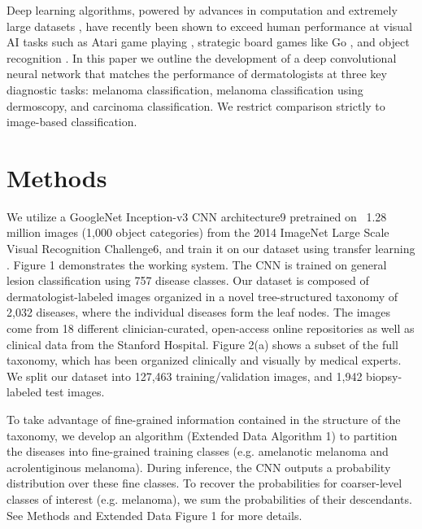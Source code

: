 Deep learning algorithms, powered by advances in computation and extremely large datasets \cite{deng2009imagenet}, have recently been shown to exceed human performance at visual AI tasks such as Atari game playing \cite{mnih2015human}, strategic board games like Go \cite{silver2016mastering}, and object recognition \cite{russakovsky2015imagenet}. In this paper we outline the development of a deep convolutional neural network that matches the performance of dermatologists at three key diagnostic tasks: melanoma classification, melanoma classification using dermoscopy, and carcinoma classification.  We restrict comparison strictly to image-based classification.

\section{Methods}

We utilize a GoogleNet Inception-v3 CNN architecture9 pretrained on ~1.28 million images (1,000 object categories) from the 2014 ImageNet Large Scale Visual Recognition Challenge6, and train it on our dataset using transfer learning \cite{pan2009survey}. Figure 1 demonstrates the working system. The CNN is trained on general lesion classification using 757 disease classes. Our dataset is composed of dermatologist-labeled images organized in a novel tree-structured taxonomy of 2,032 diseases, where the individual diseases form the leaf nodes. The images come from 18 different clinician-curated, open-access online repositories as well as clinical data from the Stanford Hospital. Figure 2(a) shows a subset of the full taxonomy, which has been organized clinically and visually by medical experts. We split our dataset into 127,463 training/validation images,  and 1,942 biopsy-labeled test images.

To take advantage of fine-grained information contained in the structure of the taxonomy, we develop an algorithm (Extended Data Algorithm 1) to partition the diseases into fine-grained training classes (e.g. amelanotic melanoma and acrolentiginous melanoma). During inference, the CNN outputs a probability distribution over these fine classes. To recover the probabilities for coarser-level classes of interest (e.g. melanoma), we sum the probabilities of their descendants. See Methods and Extended Data Figure 1 for more details.

